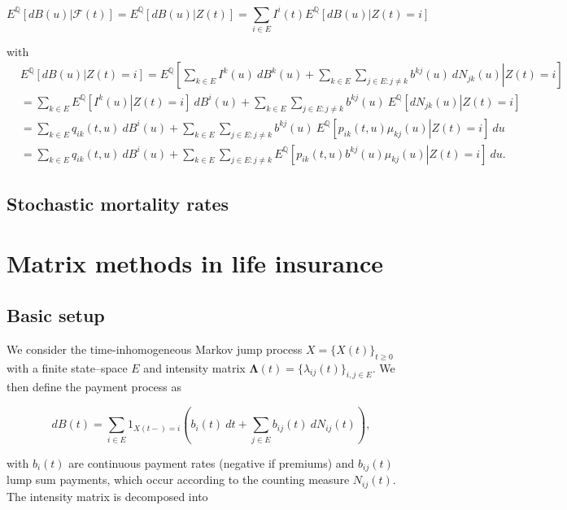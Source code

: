 \documentclass[a4paper,10pt,openany]{book}
\begin{document}
\[
E^{\mathbb Q}\left[\left.dB(u)\right\vert \mathcal F(t)\right]=E^{\mathbb Q}\left[\left.dB(u)\right\vert Z(t)\right]=\sum_{i\in E}I^i(t)E^{\mathbb Q}\left[\left.dB(u)\right\vert Z(t)=i\right]
\]

with
\begin{align*}
&E^{\mathbb Q}\left[\left.dB(u)\right\vert Z(t)=i\right]=E^{\mathbb Q}\left[\left.\sum_{k\in E}I^k(u)\ dB^k(u)+\sum_{k\in E}\sum_{j\in E : j\ne k}b^{kj}(u)\ dN_{jk}(u)\right\vert Z(t)=i\right]\\
&=\sum_{k\in E}E^{\mathbb Q}\left[\left.I^k(u)\right\vert Z(t)=i\right]\ dB^i(u)+\sum_{k\in E}\sum_{j\in E : j\ne k}b^{kj}(u)\ E^{\mathbb Q}\left[\left.dN_{jk}(u)\right\vert Z(t)=i\right]\\
&=\sum_{k\in E}q_{ik}(t,u)\ dB^i(u)+\sum_{k\in E}\sum_{j\in E : j\ne k}b^{kj}(u)\ E^{\mathbb Q}\left[\left.p_{ik}(t,u)\mu_{kj}(u)\right\vert Z(t)=i\right]\ du\\
&=\sum_{k\in E}q_{ik}(t,u)\ dB^i(u)+\sum_{k\in E}\sum_{j\in E : j\ne k}E^{\mathbb Q}\left[\left.p_{ik}(t,u)b^{kj}(u)\mu_{kj}(u)\right\vert Z(t)=i\right]\ du.
\end{align*}

\hypertarget{stochastic-mortality-rates}{%
\subsection{Stochastic mortality rates}\label{stochastic-mortality-rates}}

\hypertarget{matrix-methods-in-life-insurance}{%
\section{Matrix methods in life insurance}\label{matrix-methods-in-life-insurance}}

\hypertarget{basic-setup}{%
\subsection{Basic setup}\label{basic-setup}}

We consider the time-inhomogeneous Markov jump process \(X=\{X(t)\}_{t\ge 0}\) with a finite state--space \(E\) and intensity matrix \(\mathbf \Lambda(t)=\{\lambda_{ij}(t)\}_{i,j\in E}\). We then define the payment process as

\[
dB(t)=\sum_{i\in E}1_{X(t-)=i}\left(b_i(t)\ dt +\sum_{j\in E}b_{ij}(t)\ dN_{ij}(t)\right),
\]

with \(b_i(t)\) are continuous payment rates (negative if premiums) and \(b_{ij}(t)\) lump sum payments, which occur according to the counting measure \(N_{ij}(t)\). The intensity matrix is decomposed into
\end{document}
